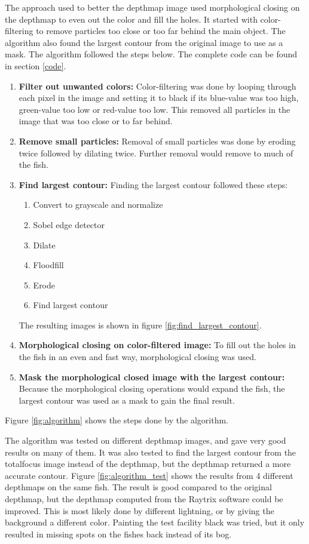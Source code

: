 The approach used to better the depthmap image used morphological closing on the depthmap to even out the color and fill the holes. It started with color-filtering to remove particles too close or too far behind the main object. The algorithm also found the largest contour from the original image to use as a mask. The algorithm followed the steps below. The complete code can be found in section \ref{code}.
\begin{enumerate}
    \item \textbf{Filter out unwanted colors:}
    Color-filtering was done by looping through each pixel in the image and setting it to black if its blue-value was too high, green-value too low or red-value too low. This removed all particles in the image that was too close or to far behind. 
    \item \textbf{Remove small particles:}
    Removal of small particles was done by eroding twice followed by dilating twice. Further removal would remove to much of the fish.
    \item \textbf{Find largest contour:}
    Finding the largest contour followed these steps: \cite{website:largest_contour_code_explanation}
    \begin{enumerate}[label*=\arabic*.]
        \item Convert to grayscale and normalize
        \item Sobel edge detector
        \item Dilate
        \item Floodfill
        \item Erode
        \item Find largest contour
    \end{enumerate}
    The resulting images is shown in figure \ref{fig:find_largest_contour}.
    \item \textbf{Morphological closing on color-filtered image:}
    To fill out the holes in the fish in an even and fast way, morphological closing was used.
    \item \textbf{Mask the morphological closed image with the largest contour:}
    Because the morphological closing operations would expand the fish, the largest contour was used as a mask to gain the final result. 
\end{enumerate}

Figure \ref{fig:algorithm} shows the steps done by the algorithm.

The algorithm was tested on different depthmap images, and gave very good results on many of them. It was also tested to find the largest contour from the totalfocus image instead of the depthmap, but the depthmap returned a more accurate contour. Figure \ref{fig:algorithm_test} shows the results from 4 different depthmaps on the same fish.
The result is good compared to the original depthmap, but the depthmap computed from the Raytrix software could be improved. This is most likely done by different lightning, or by giving the background a different color.
Painting the test facility black was tried, but it only resulted in missing spots on the fishes back instead of its bog.


